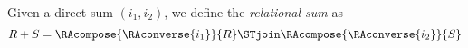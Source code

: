 \begin{definition}
\label{def:relational_sum}	
	Given a direct sum $(i_1, i_2)$, we define the \emph{relational sum} as
	\begin{equation*}
		R + S = \RAcompose{\RAconverse{i_1}}{R} \STjoin \RAcompose{\RAconverse{i_2}}{S}
	\end{equation*}
	
\end{definition}